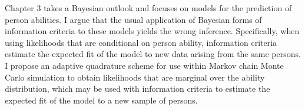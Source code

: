 \documentclass{ucbthesis}
\begin{document}
\begin{frontmatter}
Chapter 3 takes a Bayesian outlook and focuses on models for the prediction of person abilities. I argue that the usual application of Bayesian forms of information criteria to these models yields the wrong inference.
Specifically, when using likelihoods that are conditional on person ability, information criteria estimate the expected fit of the model to new data arising from the same persons.
I propose an adaptive quadrature scheme for use within Markov chain Monte Carlo simulation to obtain likelihoods that are marginal over the ability distribution, which may be used with information criteria to estimate the expected fit of the model to a new sample of persons. 

%
%
%

\end{frontmatter}
\end{document}
